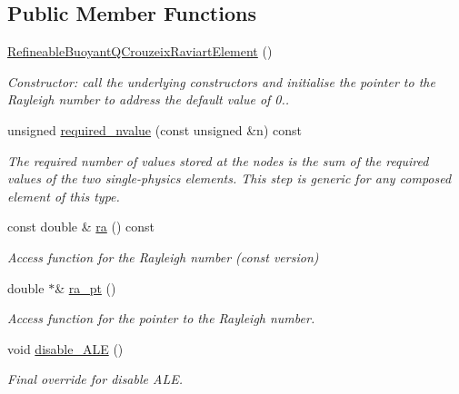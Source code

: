 \subsection*{Public Member Functions}
\begin{DoxyCompactItemize}
\item 
\hyperlink{classoomph_1_1RefineableBuoyantQCrouzeixRaviartElement_a180c3373158434bc08fc69cc0f4392f9}{Refineable\+Buoyant\+Q\+Crouzeix\+Raviart\+Element} ()
\begin{DoxyCompactList}\small\item\em Constructor\+: call the underlying constructors and initialise the pointer to the Rayleigh number to address the default value of 0.. \end{DoxyCompactList}\item 
unsigned \hyperlink{classoomph_1_1RefineableBuoyantQCrouzeixRaviartElement_a664008af1b7a6444cee34bd4f506c318}{required\+\_\+nvalue} (const unsigned \&n) const
\begin{DoxyCompactList}\small\item\em The required number of values stored at the nodes is the sum of the required values of the two single-\/physics elements. This step is generic for any composed element of this type. \end{DoxyCompactList}\item 
const double \& \hyperlink{classoomph_1_1RefineableBuoyantQCrouzeixRaviartElement_a56e468f0ee6553a538f6f8d460e6364e}{ra} () const
\begin{DoxyCompactList}\small\item\em Access function for the Rayleigh number (const version) \end{DoxyCompactList}\item 
double $\ast$\& \hyperlink{classoomph_1_1RefineableBuoyantQCrouzeixRaviartElement_acd96d12e3caedc1a38582079d977c0e4}{ra\+\_\+pt} ()
\begin{DoxyCompactList}\small\item\em Access function for the pointer to the Rayleigh number. \end{DoxyCompactList}\item 
void \hyperlink{classoomph_1_1RefineableBuoyantQCrouzeixRaviartElement_a7fdb84a7d69740668514e0dae2d07f7e}{disable\+\_\+\+A\+LE} ()
\begin{DoxyCompactList}\small\item\em Final override for disable A\+LE. \end{DoxyCompactList}\item 

\end{DoxyCompactItemize}

